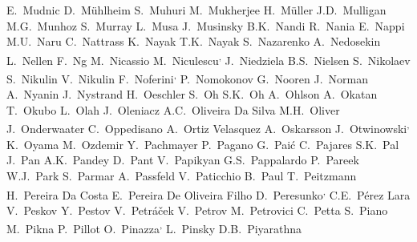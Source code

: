 \begin{flushleft}
E.~Mudnic\And
D.~M{\"u}hlheim\And
S.~Muhuri\And
M.~Mukherjee\And
H.~M\"{u}ller\And
J.D.~Mulligan\And
M.G.~Munhoz\And
S.~Murray\And
L.~Musa\And
J.~Musinsky\And
B.K.~Nandi\And
R.~Nania\And
E.~Nappi\And
M.U.~Naru\And
C.~Nattrass\And
K.~Nayak\And
T.K.~Nayak\And
S.~Nazarenko\And
A.~Nedosekin\And
L.~Nellen\And
F.~Ng\And
M.~Nicassio\And
M.~Niculescu\textsuperscript{,}\And
J.~Niedziela\And
B.S.~Nielsen\And
S.~Nikolaev\And
S.~Nikulin\And
V.~Nikulin\And
F.~Noferini\textsuperscript{,}\And
P.~Nomokonov\And
G.~Nooren\And
J.~Norman\And
A.~Nyanin\And
J.~Nystrand\And
H.~Oeschler\And
S.~Oh\And
S.K.~Oh\And
A.~Ohlson\And
A.~Okatan\And
T.~Okubo\And
L.~Olah\And
J.~Oleniacz\And
A.C.~Oliveira Da Silva\And
M.H.~Oliver\And
J.~Onderwaater\And
C.~Oppedisano\And
A.~Ortiz Velasquez\And
A.~Oskarsson\And
J.~Otwinowski\textsuperscript{,}\And
K.~Oyama\And
M.~Ozdemir\And
Y.~Pachmayer\And
P.~Pagano\And
G.~Pai\'{c}\And
C.~Pajares\And
S.K.~Pal\And
J.~Pan\And
A.K.~Pandey\And
D.~Pant\And
V.~Papikyan\And
G.S.~Pappalardo\And
P.~Pareek\And
W.J.~Park\And
S.~Parmar\And
A.~Passfeld\And
V.~Paticchio\And
B.~Paul\And
T.~Peitzmann\And
H.~Pereira Da Costa\And
E.~Pereira De Oliveira Filho\And
D.~Peresunko\textsuperscript{,}\And
C.E.~P\'erez Lara\And
V.~Peskov\And
Y.~Pestov\And
V.~Petr\'{a}\v{c}ek\And
V.~Petrov\And
M.~Petrovici\And
C.~Petta\And
S.~Piano\And
M.~Pikna\And
P.~Pillot\And
O.~Pinazza\textsuperscript{,}\And
L.~Pinsky\And
D.B.~Piyarathna\And

\end{flushleft}
